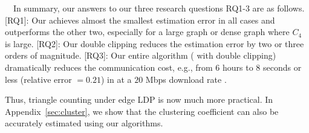 \smallskip
{}~~In summary, our answers to our three research questions RQ1-3 
are as follows. 
[RQ1]: Our \AlgTwo{} achieves almost the smallest estimation error in all cases and outperforms the other two, especially for a large graph or dense graph where $C_4$ is large. 
[RQ2]: Our double clipping reduces the estimation error by two or three orders of magnitude. 
[RQ3]: Our entire algorithm (\AlgTwo{} with double clipping) dramatically reduces the communication cost, 
e.g., 
from $6$ hours to $8$ seconds or less (relative error $=0.21$) in \IMDB{} at a $20$ Mbps download rate \cite{YouTube_speed}. 

Thus, triangle counting under edge LDP is now 
much more 
practical. 
In Appendix~\ref{sec:cluster}, we show that the clustering coefficient can also be accurately estimated using our algorithms.
